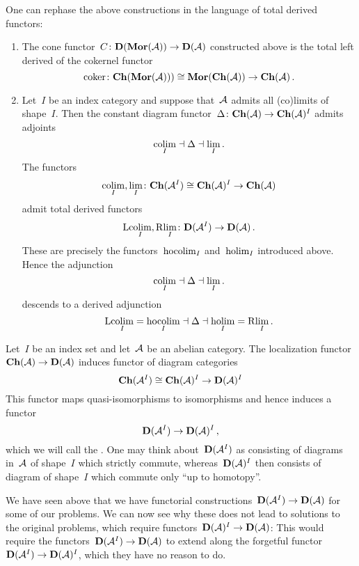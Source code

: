 \documentclass[a4paper,10pt]{scrartcl}
\begin{document}
One can rephase the above constructions in the language of total derived functors:
\begin{enumerate}
  \item
    The cone functor~$C \colon \mathbf{D}(\mathbf{Mor}(\mathcal{A})) \to \mathbf{D}(\mathcal{A})$ constructed above is the total left derived of the cokernel functor
    \[
      \operatorname{coker}
      \colon
      \mathbf{Ch}(\mathbf{Mor}(\mathcal{A})))
      \cong
      \mathbf{Mor}(\mathbf{Ch}(\mathcal{A}))
      \to
      \mathbf{Ch}(\mathcal{A}) \,.
    \]
  \item
    Let~$I$ be an index category and suppose that~$\mathcal{A}$ admits all (co)limits of shape~$I$.
    Then the constant diagram functor~$\Delta \colon \mathbf{Ch}(\mathcal{A}) \to \mathbf{Ch}(\mathcal{A})^I$ admits adjoints
    \[
      {\operatorname*{colim}_I}
      \mathrel{\dashv}
      \Delta
      \mathrel{\dashv}
      {\lim_I} \,.
    \]
    The functors
    \[
      \operatorname*{colim}_I, \lim_I
      \colon
      \mathbf{Ch}(\mathcal{A}^I)
      \cong
      \mathbf{Ch}(\mathcal{A})^I
      \to
      \mathbf{Ch}(\mathcal{A})
    \]
    admit total derived functors
    \[
      \mathrm{L} {\operatorname*{colim}_I},
      \mathrm{R} {\lim_I}
      \colon
      \mathbf{D}(\mathcal{A}^I)
      \to
      \mathbf{D}(\mathcal{A}) \,.
    \]
    These are precisely the functors~$\operatorname*{hocolim}_I$ and~$\operatorname*{holim}_I$ introduced above.
    Hence the adjunction
    \[
      {\operatorname*{colim}_I}
      \mathrel{\dashv}
      \Delta
      \mathrel{\dashv}
      {\lim_I} \,.
    \]
    descends to a derived adjunction
    \[
      \mathrm{L} {\operatorname*{colim}_I}
      =
      \operatorname*{hocolim}_I
      \mathrel{\dashv}
      \Delta
      \mathrel{\dashv}
      \operatorname*{holim}_I
      =
      \mathrm{R} {\lim_I} \,.
    \]
\end{enumerate}


\begin{remark}
  Let~$I$ be an index set and let~$\mathcal{A}$ be an abelian category.
  The localization functor~$\mathbf{Ch}(\mathcal{A}) \to \mathbf{D}(\mathcal{A})$ induces functor of diagram categories
  \[
    \mathbf{Ch}(\mathcal{A}^I)
    \cong
    \mathbf{Ch}(\mathcal{A})^I
    \to
    \mathbf{D}(\mathcal{A})^I
  \]
  This functor maps quasi-isomorphisms to isomorphisms and hence induces a functor
  \[
    \mathbf{D}(\mathcal{A}^I) \to \mathbf{D}(\mathcal{A})^I \,,
  \]
  which we will call the .
  One may think about~$\mathbf{D}(\mathcal{A}^I)$ as consisting of diagrams in~$\mathcal{A}$ of shape~$I$ which strictly commute, whereas~$\mathbf{D}(\mathcal{A})^I$ then consists of diagram of shape~$I$ which commute only \enquote{up to homotopy}.
  
  We have seen above that we have functorial constructions~$\mathbf{D}(\mathcal{A}^I) \to \mathbf{D}(\mathcal{A})$ for some of our problems.
  We can now see why these does not lead to solutions to the original problems, which require functors~$\mathbf{D}(\mathcal{A})^I \to \mathbf{D}(\mathcal{A})$:
  This would require the functors~$\mathbf{D}(\mathcal{A}^I) \to \mathbf{D}(\mathcal{A})$ to extend along the forgetful functor~$\mathbf{D}(\mathcal{A}^I) \to \mathbf{D}(\mathcal{A})^I$, which they have no reason to do.
\end{remark}
\end{document}
